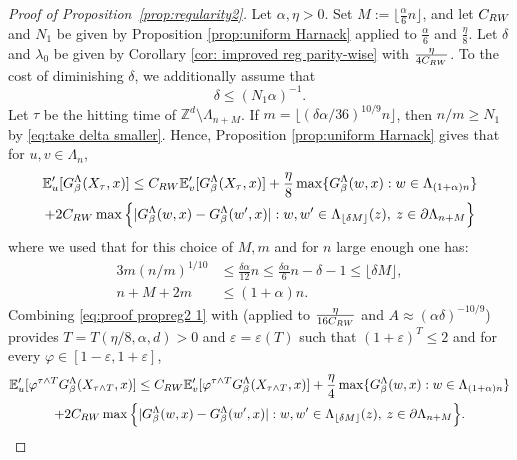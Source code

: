\documentclass[11pt,a4paper]{article}
\numberwithin{equation}{section}
\theoremstyle{plain}
\theoremstyle{definition}
\begin{document}
\begin{proof}[Proof of Proposition~\textup{\ref{prop:regularity2}}]Let $\alpha,\eta>0$. Set $M:=\lfloor \tfrac{\alpha}{6} n\rfloor$, and let $C_{\rm RW}$ and $N_1$ be given by Proposition \ref{prop:uniform Harnack} applied to $\tfrac{\alpha}{6}$ and $\tfrac{\eta}{8}$.
Let $\delta$ and $\lambda_0$ be given by Corollary \ref{cor: improved reg parity-wise} with $\frac{\eta}{4C_{\rm RW}}$. To the cost of diminishing $\delta$, we additionally assume that
\begin{equation}\label{eq:take delta smaller}
	\delta\leq (N_1\alpha)^{-1}.
\end{equation}
Let $\tau$ be the hitting time of $\mathbb Z^d\setminus\Lambda_{n+M}$. If $m=\lfloor (\delta\alpha/36)^{10/9}n\rfloor$, then $n/m\geq N_1$ by \eqref{eq:take delta smaller}. Hence, Proposition \ref{prop:uniform Harnack} gives that for $u,v\in \Lambda_n$,
\begin{multline}\label{eq:proof propreg2 1}
	\mathbb E_u'[G_\beta^{\Lambda}(X_\tau,x)]\leq C_{\rm RW}\mathbb E'_v[G_\beta^{\Lambda}(X_\tau,x)]+\frac{\eta}{8}\max\{G_\beta^{\Lambda}(w,x):w\in \Lambda_{(1+\alpha)n}\}\\+2C_{\rm RW}\max \Big\{|G_\beta^\Lambda(w,x)-G_\beta^{\Lambda}(w',x)|: w,w'\in \Lambda_{\lfloor \delta M\rfloor}(z), \: z\in \partial \Lambda_{n+M}\Big\} 
\end{multline}
where we used that for this choice of $M,m$ and for $n$ large enough one has: 
\begin{align}
3m(n/m)^{1/10}&\leq \frac{\delta \alpha}{12}n\leq \frac{\delta\alpha}{6}n-\delta-1\leq \lfloor\delta M\rfloor,\\
n+M+2m&\leq (1+\alpha)n.\end{align} 
Combining \eqref{eq:proof propreg2 1} with \cite[Corollary~A.6]{DumPan24Perco} (applied to $\frac{\eta}{16C_{\rm RW}}$ and $A\approx (\alpha\delta)^{-10/9}$) provides $T=T(\eta/8,\alpha,d)>0$ and $\varepsilon=\varepsilon(T)$ such that $(1+\varepsilon)^T\leq 2$ and for every $\varphi\in [1-\varepsilon,1+\varepsilon]$,
\begin{multline}\label{eq:proof propreg2 1.5}
	\mathbb E_u'[\varphi^{\tau\wedge T}G_\beta^{\Lambda}(X_{\tau\wedge T},x)]\leq C_{\rm RW}\mathbb E'_v[\varphi^{\tau\wedge T}G_\beta^{\Lambda}(X_{\tau\wedge T},x)]+\frac{\eta}{4}\max\{G_\beta^{\Lambda}(w,x):w\in \Lambda_{(1+\alpha)n}\}\\+2C_{\rm RW}\max \Big\{|G_\beta^\Lambda(w,x)-G_\beta^{\Lambda}(w',x)|: w,w'\in \Lambda_{\lfloor \delta M\rfloor}(z), \: z\in \partial \Lambda_{n+M}\Big\}. 

\end{multline}
\end{proof}
\end{document}
